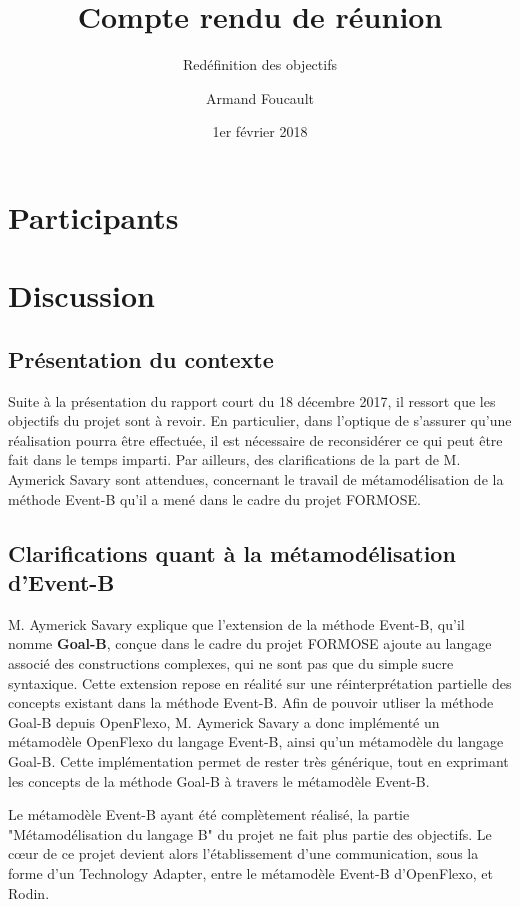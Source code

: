 \documentclass{article}
\author{Armand Foucault}
\date{1er février 2018}
\title{Compte rendu de réunion}
\subtitle{Redéfinition des objectifs}
\begin{document}
\imtammMaketitle

\section*{Participants}

\begin{imtammActorList}
\item \actorasavary
\item \actorjcbach
\item \actorafoucaul
\end{imtammActorList}


\section*{Discussion}

\subsection*{Présentation du contexte}
Suite à la présentation du rapport court du 18 décembre 2017, il ressort que les objectifs du projet sont à revoir.
En particulier, dans l'optique de s'assurer qu'une réalisation pourra être effectuée, il est nécessaire de reconsidérer ce qui peut être fait dans le temps imparti.
Par ailleurs, des clarifications de la part de M. Aymerick Savary sont attendues, concernant le travail de métamodélisation de la méthode Event-B qu'il a mené dans le cadre du projet FORMOSE.

\subsection*{Clarifications quant à la métamodélisation d'Event-B}
M. Aymerick Savary explique que l'extension de la méthode Event-B, qu'il nomme \textbf{Goal-B}, conçue dans le cadre du projet FORMOSE ajoute au langage associé des constructions complexes, %
qui ne sont pas que du simple sucre syntaxique.
Cette extension repose en réalité sur une réinterprétation partielle des concepts existant dans la méthode Event-B.
Afin de pouvoir utliser la méthode Goal-B depuis OpenFlexo, M. Aymerick Savary a donc implémenté un métamodèle OpenFlexo du langage Event-B, ainsi qu'un métamodèle du langage Goal-B.
Cette implémentation permet de rester très générique, tout en exprimant les concepts de la méthode Goal-B à travers le métamodèle Event-B.

Le métamodèle Event-B ayant été complètement réalisé, la partie "Métamodélisation du langage B" du projet ne fait plus partie des objectifs.
Le cœur de ce projet devient alors l'établissement d'une communication, sous la forme d'un Technology Adapter, entre le métamodèle Event-B d'OpenFlexo, et Rodin.
\end{document}
